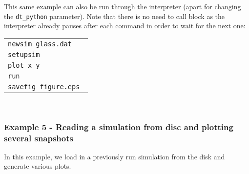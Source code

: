 \documentclass[a4paper]{article}
\newcommand{\var}[1]{\texttt{#1}}
\begin{document}
This same example can also be run through the interpreter (apart for changing the \var{dt\_python} parameter). Note that there is no need to call block as the interpreter already pauses after each command in order to wait for the next one:\\
\newline
\begin{tabular}{p{14.0cm}}
\var{newsim glass.dat} \\
\var{setupsim} \\
\var{plot x y} \\
\var{run} \\
\var{savefig figure.eps } \\
\end{tabular} \\




\subsubsection{Example 5 - Reading a simulation from disc and plotting several snapshots}
In this example, we load in a previously run simulation from the disk and generate various plots. \\



\end{document}

